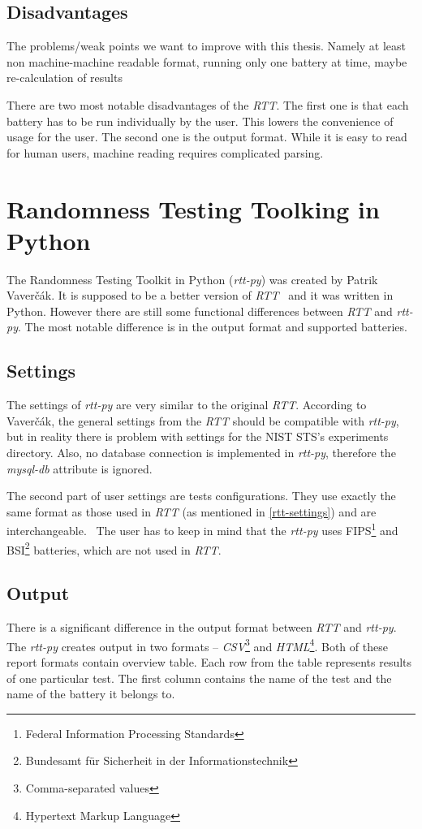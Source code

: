 \documentclass[
  digital,     %
  oneside,     %
  nosansbold,  %
  nocolorbold, %
  nolof,         %
  nolot,         %
]{fithesis4}
\begin{document}
\subsection{Disadvantages}
The problems/weak points we want to improve with this thesis. Namely at least non machine-machine readable format, running only one battery at time, maybe re-calculation of results

There are two most notable disadvantages of the \emph{RTT}. The first one is that each battery has to be run individually by the user. This lowers the convenience of usage for the user. The second one is the output format. While it is easy to read for human users, machine reading requires complicated parsing. 



\section{Randomness Testing Toolking in Python}
The Randomness Testing Toolkit in Python (\emph{rtt-py}) was created by Patrik Vaverčák. It is supposed to be a better version of \emph{RTT}~\cite[p.~24]{vavercak} and it was written in Python. However there are still some functional differences between \emph{RTT} and \emph{rtt-py}. The most notable difference is in the output format and supported batteries.

\subsection{Settings}
The settings of \emph{rtt-py} are very similar to the original \emph{RTT}. According to Vaverčák, the general settings from the \emph{RTT} should be compatible with \emph{rtt-py}, but in reality there is problem with settings for the NIST STS's experiments directory. Also, no database connection is implemented in \emph{rtt-py}, therefore the \emph{mysql-db} attribute is ignored. \cite{rtt-py-github}


The second part of user settings are tests configurations. They use exactly the same format as those used in \emph{RTT} (as mentioned in \ref{rtt-settings}) and are interchangeable.~\cite[p.~25]{vavercak} The user has to keep in mind that the \emph{rtt-py} uses FIPS\footnote{Federal Information Processing Standards} and BSI\footnote{Bundesamt für Sicherheit in der Informationstechnik} batteries, which are not used in \emph{RTT}.

\subsection{Output}
There is a significant difference in the output format between \emph{RTT} and \emph{rtt-py}. The \emph{rtt-py} creates output in two formats -- \emph{CSV}\footnote{Comma-separated values} and \emph{HTML}\footnote{Hypertext Markup Language}. Both of these report formats contain overview table. Each row from the table represents results of one particular test. The first column contains the name of the test and the name of the battery it belongs to.
\end{document}
